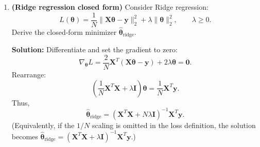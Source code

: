 \documentclass{article}
\begin{document}
\begin{enumerate}
\textbf{Solution:}
\begin{enumerate}
    \item Symmetry:
    \[
    \mathbf{P}^T = \left(\mathbf{X}(\mathbf{X}^T\mathbf{X})^{-1}\mathbf{X}^T\right)^T
    = \mathbf{X}(\mathbf{X}^T\mathbf{X})^{-1}\mathbf{X}^T = \mathbf{P},
    \]
    since $(\mathbf{X}^T\mathbf{X})^{-1}$ is symmetric.
    \item Idempotence:
    \[
    \mathbf{P}^2
    = \mathbf{X}(\mathbf{X}^T\mathbf{X})^{-1}\mathbf{X}^T\mathbf{X}(\mathbf{X}^T\mathbf{X})^{-1}\mathbf{X}^T
    = \mathbf{X}(\mathbf{X}^T\mathbf{X})^{-1}\mathbf{X}^T
    = \mathbf{P}.
    \]
    \item Interpretation: $\hat{\mathbf{y}}=\mathbf{P}\mathbf{y}$ is the \emph{orthogonal projection} of $\mathbf{y}$ onto $\mathrm{span}(\mathbf{X})$ (the column space of $\mathbf{X}$).
\end{enumerate}

\item \textbf{(Ridge regression closed form)}  
Consider Ridge regression:
\[
L(\boldsymbol{\theta})=\frac{1}{N}\|\mathbf{X}\boldsymbol{\theta}-\mathbf{y}\|_2^2+\lambda\|\boldsymbol{\theta}\|_2^2,\qquad \lambda\ge 0.
\]
Derive the closed-form minimizer $\hat{\boldsymbol{\theta}}_{\mathrm{ridge}}$.

\textbf{Solution:}
Differentiate and set the gradient to zero:
\[
\nabla_{\boldsymbol{\theta}}L
= \frac{2}{N}\mathbf{X}^T(\mathbf{X}\boldsymbol{\theta}-\mathbf{y}) + 2\lambda\boldsymbol{\theta} = \mathbf{0}.
\]
Rearrange:
\[
\left(\frac{1}{N}\mathbf{X}^T\mathbf{X}+\lambda \mathbf{I}\right)\boldsymbol{\theta}
= \frac{1}{N}\mathbf{X}^T\mathbf{y}.
\]
Thus,
\[
\hat{\boldsymbol{\theta}}_{\mathrm{ridge}}
= \left(\mathbf{X}^T\mathbf{X}+N\lambda \mathbf{I}\right)^{-1}\mathbf{X}^T\mathbf{y}.
\]
(Equivalently, if the $1/N$ scaling is omitted in the loss definition, the solution becomes
$\hat{\boldsymbol{\theta}}_{\mathrm{ridge}}=(\mathbf{X}^T\mathbf{X}+\lambda\mathbf{I})^{-1}\mathbf{X}^T\mathbf{y}$.)



\end{enumerate}
\end{document}
